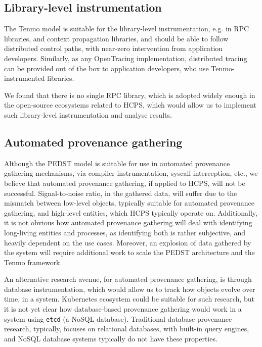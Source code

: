 \subsection{Library-level instrumentation}

The Tenmo model is suitable for the library-level instrumentation, e.g. in RPC libraries, and context propagation libraries, and should be able to follow distributed control paths, with near-zero intervention from application developers. Similarly, as any OpenTracing implementation, distributed tracing can be provided out of the box to application developers, who use Tenmo-instrumented libraries.

We found that there is no single RPC library, which is adopted widely enough in the open-source ecosystems related to HCPS, which would allow us to implement such library-level instrumentation and analyse results.

\subsection{Automated provenance gathering}

Although the PEDST model is suitable for use in automated provenance gathering mechanisms, via compiler instrumentation, syscall interception, etc., we believe that automated provenance gathering, if applied to HCPS, will not be successful. Signal-to-noise ratio, in the gathered data, will suffer due to the mismatch between low-level objects, typically suitable for automated provenance gathering, and high-level entities, which HCPS typically operate on. Additionally, it is not obvious how automated provenance gathering will deal with identifying long-living entities and processes, as identifying both is rather subjective, and heavily dependent on the use cases. Moreover, an explosion of data gathered by the system will require additional work to scale the PEDST architecture and the Tenmo framework. 

An alternative research avenue, for automated provenance gathering, is through database instrumentation, which would allow us to track how objects evolve over time, in a system. Kubernetes ecosystem could be suitable for such research, but it is not yet clear how database-based provenance gathering would work in a system using \texttt{etcd} (a NoSQL database). Traditional database provenance research, typically, focuses on relational databases, with built-in query engines, and NoSQL database systems typically do not have these properties.

